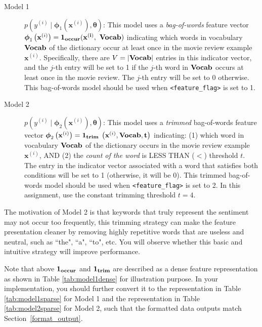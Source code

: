 \documentclass[11pt,addpoints,answers]{exam}
\newcommand{\xv}{\mathbf{x}}
\newcommand{\thetav     }{\boldsymbol \theta     }
\begin{document}
\begin{description}
    \item[Model 1] $p\left(y^{(i)} \mid \boldsymbol{\phi}_1\left(\xv^{(i)}\right), \thetav\right)$: This model uses a \emph{bag-of-words} feature vector $\boldsymbol{\phi}_1\left(\xv^{(i)}\right) = \bf{1}_{occur}( \xv^{(i)},$ $\bf{Vocab})$ indicating which words in vocabulary $\bf{Vocab}$ of the dictionary occur at least once in the movie review example $\xv^{(i)}$. Specifically, there are $V=|\bf{Vocab}|$ entries in this indicator vector, and the $j$-th entry will be set to 1 if the $j$-th word in $\bf{Vocab}$ occurs at least once in the movie review. The $j$-th entry will be set to 0 otherwise. This bag-of-words model should be used when \texttt{<feature\_flag>} is set to 1.
    
    \item[Model 2] $p\left(y^{(i)} \mid \boldsymbol{\phi}_2\left(\xv^{(i)}\right), \thetav \right)$: This model uses a \emph{trimmed} bag-of-words feature vector $\boldsymbol{\phi}_2\left(\xv^{(i)}\right) = \bf{1}_{trim}$ $\left( \xv^{(i)},\bf{Vocab},t\right)$ indicating: (1) which word in vocabulary $\bf{Vocab}$ of the dictionary occurs in the movie review example $\xv^{(i)}$, AND (2) the \emph{count of the word} is LESS THAN ($<$) threshold $t$. The entry in the indicator vector associated with a word that satisfies both conditions will be set to 1 (otherwise, it will be 0). This trimmed bag-of-words model should be used when \texttt{<feature\_flag>} is set to 2. In this assignment, use the constant trimming threshold $t=4$.
    
\end{description}

The motivation of Model 2 is that keywords that truly represent the sentiment may not occur too frequently, this trimming strategy can make the feature presentation cleaner by removing highly repetitive words that are useless and neutral, such as ``the", ``a", ``to", etc. You will observe whether this basic and intuitive strategy will improve performance.

Note that above $\bf{1}_{occur}$ and $\bf{1}_{trim}$ are described as a dense feature representation as shown in Table \ref{tab:model1dense} for illustration purpose. In your implementation, you should further convert it to the representation in Table \ref{tab:model1sparse} for Model 1 and the representation in Table \ref{tab:model2sparse} for Model 2, such that the formatted data outputs match Section~\ref{format_output}.
\end{document}
